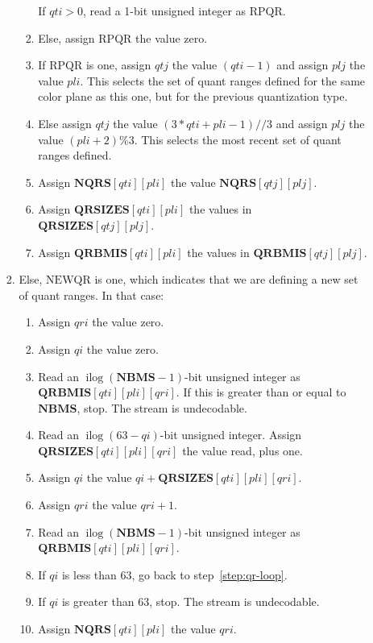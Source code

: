 \documentclass[11pt,letterpaper]{book}
\newcommand{\idx}[1]{{\ensuremath{\mathit{#1}}}}
\newcommand{\qti}{\idx{qti}}
\newcommand{\qtj}{\idx{qtj}}
\newcommand{\pli}{\idx{pli}}
\newcommand{\plj}{\idx{plj}}
\newcommand{\qi}{\idx{qi}}
\newcommand{\qri}{\idx{qri}}
\newcommand{\bitvar}[1]{\ensuremath{\mathbf{\bm #1}}}
\newcommand{\locvar}[1]{\ensuremath{\mathrm{#1}}}
\newcommand{\ilog}{\ensuremath{\mathop{\mathrm{ilog}}\nolimits}}
\numberwithin{equation}{chapter}
\numberwithin{figure}{chapter}
\numberwithin{table}{chapter}
\begin{document}
\begin{enumerate}
\begin{enumerate}
\begin{enumerate}
\begin{enumerate}
If $\locvar{\qti}>0$, read a 1-bit unsigned integer as \locvar{RPQR}.
\item
Else, assign \locvar{RPQR} the value zero.
\item
If \locvar{RPQR} is one, assign \locvar{\qtj} the value $(\locvar{\qti}-1)$
 and assign \locvar{\plj} the value \locvar{\pli}.
This selects the set of quant ranges defined for the same color plane as this
 one, but for the previous quantization type.
\item
Else assign \locvar{\qtj} the value $(3*\locvar{\qti}+\locvar{\pli}-1)//3$ and
 assign \locvar{\plj} the value $(\locvar{\pli}+2)\%3$.
This selects the most recent set of quant ranges defined.
\item
Assign $\bitvar{NQRS}[\locvar{\qti}][\locvar{\pli}]$ the value
 $\bitvar{NQRS}[\locvar{\qtj}][\locvar{\plj}]$.
\item
Assign $\bitvar{QRSIZES}[\locvar{\qti}][\locvar{\pli}]$ the values in 
 $\bitvar{QRSIZES}[\locvar{\qtj}][\locvar{\plj}]$.
\item
Assign $\bitvar{QRBMIS}[\locvar{\qti}][\locvar{\pli}]$ the values in
 $\bitvar{QRBMIS}[\locvar{\qtj}][\locvar{\plj}]$.
\end{enumerate}
\item
Else, \locvar{NEWQR} is one, which indicates that we are defining a new set of
 quant ranges.
In that case:
\begin{enumerate}
\item
Assign $\locvar{\qri}$ the value zero.
\item
Assign $\locvar{\qi}$ the value zero.
\item
Read an $\ilog(\bitvar{NBMS}-1)$-bit unsigned integer as\\
 $\bitvar{QRBMIS}[\locvar{\qti}][\locvar{\pli}][\locvar{\qri}]$.
If this is greater than or equal to \bitvar{NBMS}, stop.
The stream is undecodable.
\item
\label{step:qr-loop}
Read an $\ilog(63-\locvar{\qi})$-bit unsigned integer.
Assign\\ $\bitvar{QRSIZES}[\locvar{\qti}][\locvar{\pli}][\locvar{\qri}]$ the value
 read, plus one.
\item
Assign \locvar{\qi} the value $\locvar{\qi}+
 \bitvar{QRSIZES}[\locvar{\qti}][\locvar{\pli}][\locvar{\qri}]$.
\item
Assign \locvar{\qri} the value $\locvar{\qri}+1$.
\item
Read an $\ilog(\bitvar{NBMS}-1)$-bit unsigned integer as\\
 $\bitvar{QRBMIS}[\locvar{\qti}][\locvar{\pli}][\locvar{\qri}]$.
\item
If \locvar{\qi} is less than 63, go back to step~\ref{step:qr-loop}.
\item
If \locvar{\qi} is greater than 63, stop.
The stream is undecodable.
\item
Assign $\bitvar{NQRS}[\locvar{\qti}][\locvar{\pli}]$ the value \locvar{\qri}.
\end{enumerate}
\end{enumerate}
\end{enumerate}
\end{enumerate}
\end{document}
